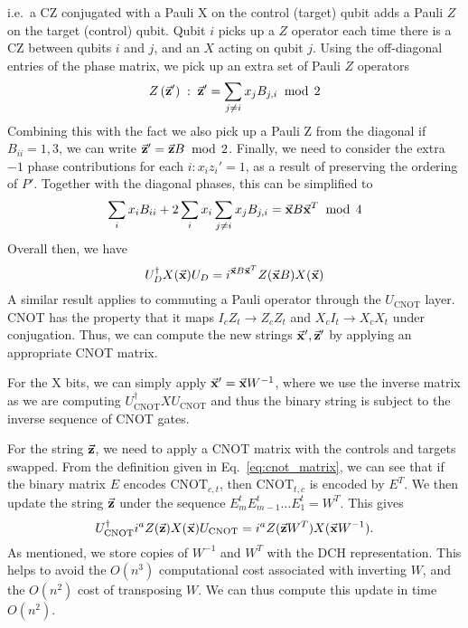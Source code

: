 i.e.~a CZ conjugated with a Pauli X on the control (target) qubit adds a Pauli $Z$ on the target (control) qubit. Qubit $i$ picks up a $Z$ operator each time there is a CZ between qubits $i$ and $j$, and an $X$ acting on qubit $j$. Using the off-diagonal entries of the phase matrix, we pick up an extra set of Pauli $Z$ operators
\[Z\left(\va{z}'\right)\;:\;\va{z}' = \sum_{j\neq i}x_{j}B_{j,i}\;\bmod\,2\]
Combining this with the fact we also pick up a Pauli Z from the diagonal if $B_{ii}=1,3$, we can write $\va{z}'=\va{z}B\;\bmod\,2$. Finally, we need to consider the extra $-1$ phase  contributions for each $i:x_{i}z_{i}'=1$, as a result of preserving the ordering of $P'$. Together with the diagonal phases, this can be simplified to
\[
\sum_{i}x_{i}B_{ii} + 2\sum_{i}x_{i}\sum_{j\neq i}x_{j}B_{j,i} = \va{x}B\va{x}^{T}\;\bmod\, 4
\]
Overall then, we have
\begin{equation}
U_{D}^{\dagger}X(\va{x})U_{D} = i^{\va{x}B\va{x}^{T}}Z(\va{x}B)X(\va{x})
\label{eq:dch_dupdate}
\end{equation}
A similar result applies to commuting a Pauli operator through the $U_{\text{CNOT}}$ layer. CNOT has the property that it maps $I_{c}Z_{t}\rightarrow Z_{c}Z_{t}$ and $X_{c}I_{t}\rightarrow X_{c}X_{t}$ under conjugation. Thus, we can compute the new strings $\va{x}',\va{z}'$ by applying an appropriate CNOT matrix.\par
For the X bits, we can simply apply $\va{x}'=\va{x}W^{-1}$, where we use the inverse matrix as we are computing $U_{\text{CNOT}}^{\dagger} X U_{\text{CNOT}}$ and thus the binary string is subject to the inverse sequence of CNOT gates. \par
For the string $\va{z}$, we need to apply a CNOT matrix with the controls and targets swapped. From the definition given in Eq.~\ref{eq:cnot_matrix}, we can see that if the binary matrix $E$ encodes $\text{CNOT}_{c,t}$, then $\text{CNOT}_{t,c}$ is encoded by $E^{T}$. We then update the string $\va{z}$ under the sequence $E_{m}^{t}E_{m-1}^{t}\dots E_{1}^{t} = W^{T}$. This gives
\begin{equation}
U_{\text{CNOT}}^{\dagger}i^{a}Z(\va{z})X(\va{x})U_{\text{CNOT}} = i^{a}Z(\va{z}W^{T})X(\va{x}W^{-1}).
\label{eq:dch_cupdate}
\end{equation}
As mentioned, we store copies of $W^{-1}$ and $W^{T}$ with the DCH representation. This helps to avoid the $O(n^{3})$ computational cost associated with inverting $W$, and the $O(n^{2})$ cost of transposing $W$. We can thus compute this update in time $O(n^{2})$.\par
